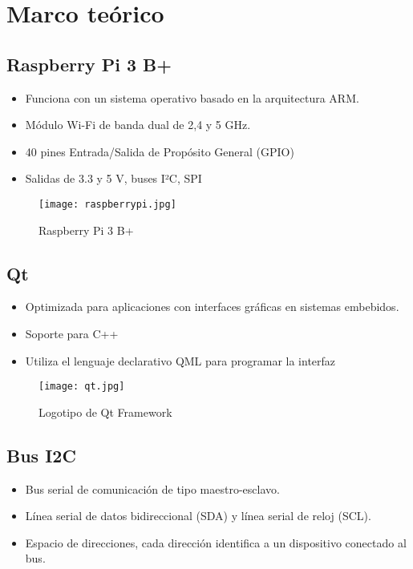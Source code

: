 \section{Marco teórico}

\subsection*{Raspberry Pi 3 B+}
\begin{itemize}
	\item Funciona con un sistema operativo basado en la arquitectura ARM.
	\item Módulo Wi-Fi de banda dual de 2,4 y 5 GHz.
	\item 40 pines Entrada/Salida de Propósito General (GPIO)
	\item Salidas de 3.3 y 5 V, buses I²C, SPI
\end{itemize}

\begin{figure}[htb]
	\centering
	\texttt{[image: raspberrypi.jpg]}
	\caption{Raspberry Pi 3 B+}
\end{figure}

\subsection*{Qt}
\begin{itemize}
	\item Optimizada para aplicaciones con interfaces gráficas en sistemas embebidos.
	\item Soporte para C++
	\item Utiliza el lenguaje declarativo QML para programar la interfaz
\end{itemize}

\begin{figure}[htb]
	\centering
	\texttt{[image: qt.jpg]}
	\caption{Logotipo de Qt Framework}
\end{figure}

\subsection*{Bus I2C}
\begin{itemize}
	\item Bus serial de comunicación de tipo maestro-esclavo.
	\item Línea serial de datos bidireccional (SDA)  y línea serial de reloj (SCL).
	\item Espacio de direcciones, cada dirección identifica a un dispositivo conectado al bus.
\end{itemize}

